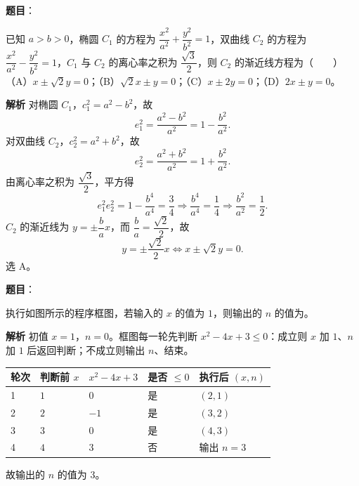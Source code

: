 \begin{answer}

\textbf{题目}：

已知 $a>b>0$，椭圆 $C_1$ 的方程为 $\dfrac{x^2}{a^2}+\dfrac{y^2}{b^2}=1$，双曲线 $C_2$ 的方程为 $\dfrac{x^2}{a^2}-\dfrac{y^2}{b^2}=1$，$C_1$ 与 $C_2$ 的离心率之积为 $\dfrac{\sqrt3}2$，则 $C_2$ 的渐近线方程为\mbox{（　　）}
（A）$x\pm\sqrt2y=0$；（B）$\sqrt2x\pm y=0$；（C）$x\pm2y=0$；（D）$2x\pm y=0$。

\textbf{解析}
对椭圆 $C_1$，$c_1^2=a^2-b^2$，故
\nopagebreak[4]
\[e_1^2=\frac{a^2-b^2}{a^2}=1-\frac{b^2}{a^2} .\]
对双曲线 $C_2$，$c_2^2=a^2+b^2$，故
\nopagebreak[4]
\[e_2^2=\frac{a^2+b^2}{a^2}=1+\frac{b^2}{a^2} .\]
由离心率之积为 $\dfrac{\sqrt3}2$，平方得
\nopagebreak[4]
\[e_1^2e_2^2=1-\frac{b^4}{a^4}=\frac34\Longrightarrow\frac{b^4}{a^4}=\frac14\Longrightarrow\frac{b^2}{a^2}=\frac12 .\]
$C_2$ 的渐近线为 $y=\pm\dfrac bax$，而 $\dfrac ba=\dfrac{\sqrt2}2$，故
\nopagebreak[4]
\[y=\pm\frac{\sqrt2}2x\iff x\pm\sqrt2y=0 .\]
选 A。


\end{answer}
\begin{answer}

\textbf{题目}：

执行如图所示的程序框图，若输入的 $x$ 的值为 $1$，则输出的 $n$ 的值为\gkblank{}。
\nopagebreak[4]
\begin{center}\end{center}
\nopagebreak[4]
\textbf{解析}
初值 $x=1$，$n=0$。框图每一轮先判断 $x^2-4x+3\leqslant0$：成立则 $x$ 加 $1$、$n$ 加 $1$ 后返回判断；不成立则输出 $n$、结束。
\begin{center}
\begin{tabular}{lllll}
\toprule
轮次 & 判断前 $x$ & $x^2-4x+3$ & 是否 $\leqslant0$ & 执行后 $(x,n)$ \\
\midrule
1 & $1$ & $0$ & 是 & $(2,1)$ \\
2 & $2$ & $-1$ & 是 & $(3,2)$ \\
3 & $3$ & $0$ & 是 & $(4,3)$ \\
4 & $4$ & $3$ & 否 & 输出 $n=3$ \\
\bottomrule
\end{tabular}
\end{center}
故输出的 $n$ 的值为 $3$。


\end{answer}
